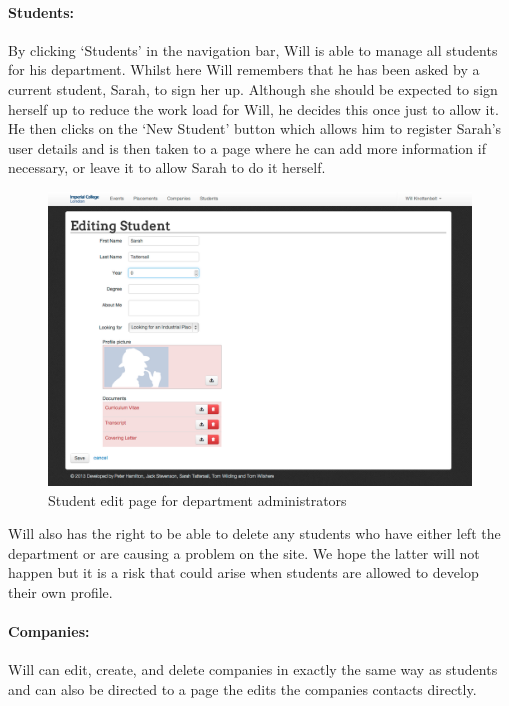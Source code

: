   \paragraph{Students:}
    By clicking `Students' in the navigation bar, Will is able to manage all students for his department.
    Whilst here Will remembers that he has been asked by a current student, Sarah, to sign her up. Although she should be expected to sign herself up to reduce the work load for Will, he decides this once just to allow it.
    He then clicks on the `New Student' button which allows him to register Sarah's user details and is then taken to a page where he can add more information if necessary, or leave it to allow Sarah to do it herself.
    \begin{figure}[H]\centering
    \includegraphics[scale=0.3]{images/user_experiences/admin/admin_student_edit}
    \caption{Student edit page for department administrators}
    \end{figure}

    Will also has the right to be able to delete any students who have either left the department or are causing a problem on the site. We hope the latter will not happen but it is a risk that could arise when students are allowed to develop their own profile.

  \paragraph{Companies:}
    Will can edit, create, and delete companies in exactly the same way as students and can also be directed to a page the edits the companies contacts directly.

